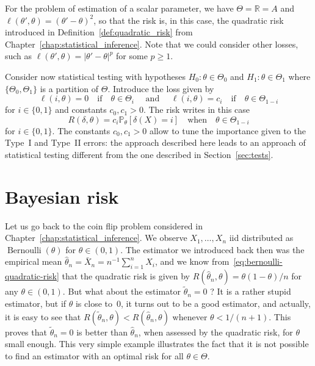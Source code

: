 \documentclass[
	fontsize=11pt, %
	twoside=false, %
	numbers=noenddot, %
]{kaobook}
\DeclareMathOperator{\ber}{Bernoulli}
\renewcommand{\P}{\mathbb P}
\newcommand{\R}{\mathbb R}
\newcommand{\wh}{\widehat}
\newcommand{\wt}{\widetilde}
\begin{document}
For the problem of estimation of a scalar parameter, we have $\Theta = \R = A$ and $\ell(\theta', \theta) = (\theta' - \theta)^2$, so that the risk is, in this case, the quadratic risk introduced in Definition~\ref{def:quadratic_risk} from Chapter~\ref{chap:statistical_inference}.
Note that we could consider other losses, such as $\ell(\theta', \theta) = |\theta' - \theta|^p$ for some $p \geq 1$.


Consider now statistical testing with hypotheses $H_0 : \theta \in \Theta_0$ and $H_1 : \theta \in \Theta_1$ where $\{ \Theta_0, \Theta_1 \}$ is a partition of $\Theta$.
Introduce the loss given by
\begin{equation}
	\label{eq:bayes-test-loss}
	\ell(i, \theta) = 0	\quad \text{if} \quad \theta \in \Theta_i \quad \text{ and } \quad \ell(i, \theta) = c_i \quad \text{if} \quad \theta \in \Theta_{1 - i}
\end{equation}
for $i \in \{ 0, 1 \}$ and constants $c_0, c_1 > 0$.
The risk writes in this case
\begin{equation*}
	R(\delta, \theta) =	c_i \P_\theta [\delta(X) = i] \quad \text{when} 
	\quad \theta \in \Theta_{1 - i}
\end{equation*}
for $i \in \{ 0, 1 \}$.
The constants $c_0, c_1 > 0$ allow to tune the importance given to the Type~I and Type~II errors: the approach described here leads to an approach of statistical testing different from the one described in Section~\ref{sec:tests}.


\section{Bayesian risk} %
\label{sec:bayesian-risk}

Let us go back to the coin flip problem considered in Chapter~\ref{chap:statistical_inference}.
We observe $X_1, \ldots, X_n$ iid distributed as $\ber(\theta)$ for $\theta \in (0, 1)$.
The estimator we introduced back then was the empirical mean $\wh \theta_n = \bar X_n = n^{-1} \sum_{i=1}^n X_i$, and we know from~\eqref{eq:bernoulli-quadratic-risk} that the quadratic risk is given by $R(\wh \theta_n, \theta) = \theta (1 - \theta) / n$ for any $\theta \in (0, 1)$.
But what about the estimator $\wt \theta_n = 0$ ? It is a rather stupid estimator, but if $\theta$ is close to~$0$, it turns out to be a good estimator, and actually, it is easy to see that
$R(\wt \theta_n, \theta) < R(\wh \theta_n, \theta)$ whenever $\theta < 1 / (n + 1)$.
This proves that $\wt \theta_n = 0$ is better than $\wh \theta_n$, when assessed by the quadratic risk, for $\theta$ small enough.%
This very simple example illustrates the fact that it is not possible to find an estimator with an optimal risk for all $\theta \in \Theta$.
\end{document}
